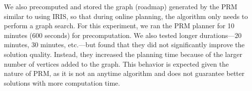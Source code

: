 We also precomputed and stored the graph (roadmap) generated by the PRM similar to using IRIS, so that during online planning, the algorithm only needs to perform a graph search. For this experiment, we ran the PRM planner for 10 minutes (600 seconds) for precomputation. We also tested longer durations---20 minutes, 30 minutes, etc.---but found that they did not significantly improve the solution quality. Instead, they increased the planning time because of the larger number of vertices added to the graph. This behavior is expected given the nature of PRM, as it is not an anytime algorithm and does not guarantee better solutions with more computation time.
